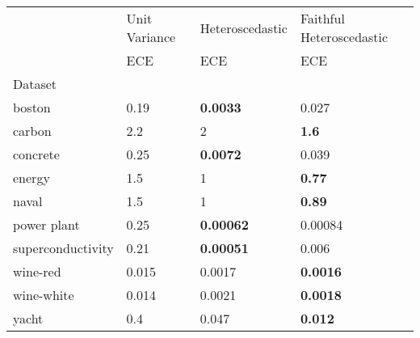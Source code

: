 \begin{tabular}{l|l|l|l}
\toprule
 & Unit Variance & Heteroscedastic & Faithful Heteroscedastic \\
 & ECE & ECE & ECE \\
Dataset &  &  &  \\
\midrule
boston & 0.19 & \bfseries 0.0033 & 0.027 \\
carbon & 2.2 & 2 & \bfseries 1.6 \\
concrete & 0.25 & \bfseries 0.0072 & 0.039 \\
energy & 1.5 & 1 & \bfseries 0.77 \\
naval & 1.5 & 1 & \bfseries 0.89 \\
power plant & 0.25 & \bfseries 0.00062 & 0.00084 \\
superconductivity & 0.21 & \bfseries 0.00051 & 0.006 \\
wine-red & 0.015 & 0.0017 & \bfseries 0.0016 \\
wine-white & 0.014 & 0.0021 & \bfseries 0.0018 \\
yacht & 0.4 & 0.047 & \bfseries 0.012 \\
\bottomrule
\end{tabular}

